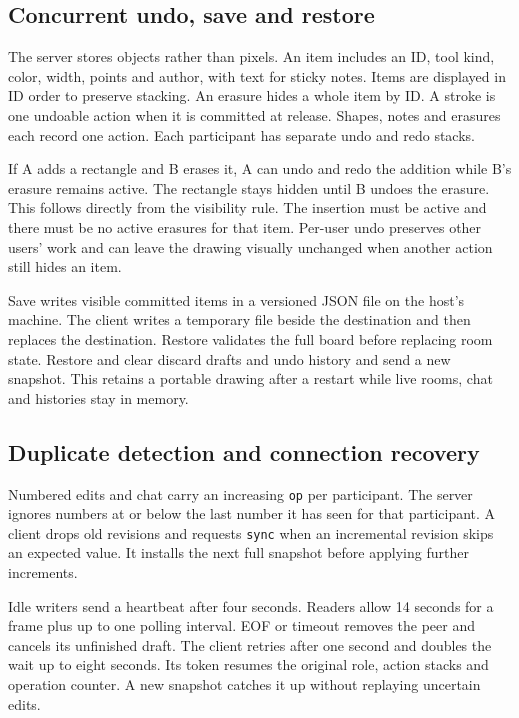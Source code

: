 \documentclass[11pt,a4paper]{article}
\newcommand{\code}[1]{\texttt{#1}}
\begin{document}
\subsection{Concurrent undo, save and restore}

The server stores objects rather than pixels. An item includes an ID, tool kind, color, width, points and author, with text for sticky notes. Items are displayed in ID order to preserve stacking. An erasure hides a whole item by ID. A stroke is one undoable action when it is committed at release. Shapes, notes and erasures each record one action. Each participant has separate undo and redo stacks.

If A adds a rectangle and B erases it, A can undo and redo the addition while B's erasure remains active. The rectangle stays hidden until B undoes the erasure. This follows directly from the visibility rule. The insertion must be active and there must be no active erasures for that item. Per-user undo preserves other users' work and can leave the drawing visually unchanged when another action still hides an item.

Save writes visible committed items in a versioned JSON file on the host's machine. The client writes a temporary file beside the destination and then replaces the destination. Restore validates the full board before replacing room state. Restore and clear discard drafts and undo history and send a new snapshot. This retains a portable drawing after a restart while live rooms, chat and histories stay in memory.

\subsection{Duplicate detection and connection recovery}

Numbered edits and chat carry an increasing \code{op} per participant. The server ignores numbers at or below the last number it has seen for that participant. A client drops old revisions and requests \code{sync} when an incremental revision skips an expected value. It installs the next full snapshot before applying further increments.

Idle writers send a heartbeat after four seconds. Readers allow 14 seconds for a frame plus up to one polling interval. EOF or timeout removes the peer and cancels its unfinished draft. The client retries after one second and doubles the wait up to eight seconds. Its token resumes the original role, action stacks and operation counter. A new snapshot catches it up without replaying uncertain edits.
\end{document}

